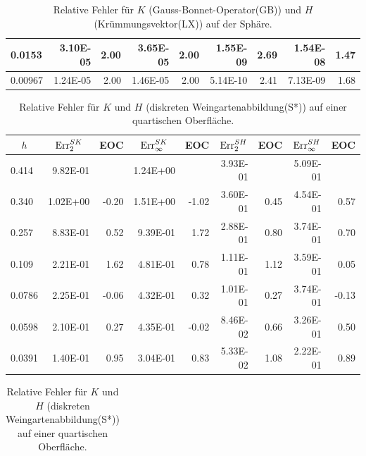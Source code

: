 \begin{table}[htbp]
\begin{tabular}{|l|r|r|r|r|r|r|r|r|}
            0.0153 & 3.10E-05 & 2.00 & 3.65E-05 & 2.00 & 1.55E-09 & 2.69 & 1.54E-08 & 1.47 \\ \hline
            0.00967 & 1.24E-05 & 2.00 & 1.46E-05 & 2.00 & 5.14E-10 & 2.41 & 7.13E-09 & 1.68 \\ \hline
      \end{tabular}
      \caption[Gauß-Bonnet und Krümmungsvektor auf der Sphäre]{Relative Fehler für \( K \) (Gauss-Bonnet-Operator(GB)) und \( H \)
      (Krümmungsvektor(LX)) auf der Sphäre.}
      \label{tabSphereGBLX}
   \end{table}

   \begin{table}[htbp]
      \begin{tabular}{|l|r|r|r|r|r|r|r|r|}
      \hline
      \multicolumn{1}{|c|}{\rule{0pt}{11pt}\( h \)} & \multicolumn{1}{c|}{\( \text{Err}_{2}^{SK} \)} & \multicolumn{1}{c|}{EOC} & 
           \multicolumn{1}{c|}{\( \text{Err}_{\infty}^{SK} \)} & \multicolumn{1}{c|}{EOC} & \multicolumn{1}{c|}{\( \text{Err}_{2}^{SH} \)} &
           \multicolumn{1}{c|}{EOC} & \multicolumn{1}{c|}{\( \text{Err}_{\infty}^{SH} \)} & \multicolumn{1}{c|}{EOC} \\ \hline
           0.414 & 9.82E-01 & \multicolumn{1}{l|}{} & 1.24E+00 & \multicolumn{1}{l|}{} & 3.93E-01 & \multicolumn{1}{l|}{} & 5.09E-01 & \multicolumn{1}{l|}{} \\ \hline
            0.340 & 1.02E+00 & -0.20 & 1.51E+00 & -1.02 & 3.60E-01 & 0.45 & 4.54E-01 & 0.57 \\ \hline
            0.257 & 8.83E-01 & 0.52 & 9.39E-01 & 1.72 & 2.88E-01 & 0.80 & 3.74E-01 & 0.70 \\ \hline
            0.109 & 2.21E-01 & 1.62 & 4.81E-01 & 0.78 & 1.11E-01 & 1.12 & 3.59E-01 & 0.05 \\ \hline
            0.0786 & 2.25E-01 & -0.06 & 4.32E-01 & 0.32 & 1.01E-01 & 0.27 & 3.74E-01 & -0.13 \\ \hline
            0.0598 & 2.10E-01 & 0.27 & 4.35E-01 & -0.02 & 8.46E-02 & 0.66 & 3.26E-01 & 0.50 \\ \hline
            0.0391 & 1.40E-01 & 0.95 & 3.04E-01 & 0.83 & 5.33E-02 & 1.08 & 2.22E-01 & 0.89 \\ \hline
      \end{tabular}
      \caption[Weingarten auf einer quartischen Oberfläche]{Relative Fehler für \( K \) und \( H \) (diskreten Weingartenabbildung(S*)) auf einer quartischen Oberfläche.}
      \label{tabHeineBWeingarten}
      \vspace{10pt}
      \begin{tabular}{|l|r|r|r|r|r|r|r|r|}

\end{tabular}
\end{table}
